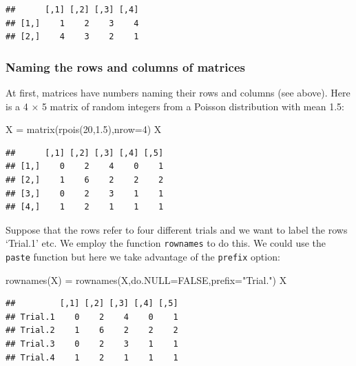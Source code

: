 \documentclass[
]{book}
\newenvironment{Shaded}{\begin{snugshade}}{\end{snugshade}}
\newcommand{\AttributeTok}[1]{\textcolor[rgb]{0.77,0.63,0.00}{#1}}
\newcommand{\ConstantTok}[1]{\textcolor[rgb]{0.00,0.00,0.00}{#1}}
\newcommand{\DecValTok}[1]{\textcolor[rgb]{0.00,0.00,0.81}{#1}}
\newcommand{\FloatTok}[1]{\textcolor[rgb]{0.00,0.00,0.81}{#1}}
\newcommand{\FunctionTok}[1]{\textcolor[rgb]{0.00,0.00,0.00}{#1}}
\newcommand{\NormalTok}[1]{#1}
\newcommand{\OtherTok}[1]{\textcolor[rgb]{0.56,0.35,0.01}{#1}}
\newcommand{\StringTok}[1]{\textcolor[rgb]{0.31,0.60,0.02}{#1}}
\begin{document}
\begin{verbatim}
##      [,1] [,2] [,3] [,4]
## [1,]    1    2    3    4
## [2,]    4    3    2    1
\end{verbatim}

\hypertarget{naming-the-rows-and-columns-of-matrices}{%
\subsubsection{Naming the rows and columns of matrices}\label{naming-the-rows-and-columns-of-matrices}}

At first, matrices have numbers naming their rows and columns (see above). Here is a 4 × 5 matrix of random integers from a Poisson distribution with mean 1.5:

\begin{Shaded}
\begin{Highlighting}[]
\NormalTok{X }\OtherTok{=} \FunctionTok{matrix}\NormalTok{(}\FunctionTok{rpois}\NormalTok{(}\DecValTok{20}\NormalTok{,}\FloatTok{1.5}\NormalTok{),}\AttributeTok{nrow=}\DecValTok{4}\NormalTok{)}
\NormalTok{X}
\end{Highlighting}
\end{Shaded}

\begin{verbatim}
##      [,1] [,2] [,3] [,4] [,5]
## [1,]    0    2    4    0    1
## [2,]    1    6    2    2    2
## [3,]    0    2    3    1    1
## [4,]    1    2    1    1    1
\end{verbatim}

Suppose that the rows refer to four different trials and we want to label the rows `Trial.1' etc. We employ the function \texttt{rownames} to do this. We could use the \texttt{paste} function but here we take advantage of the \texttt{prefix} option:

\begin{Shaded}
\begin{Highlighting}[]
\FunctionTok{rownames}\NormalTok{(X) }\OtherTok{=} \FunctionTok{rownames}\NormalTok{(X,}\AttributeTok{do.NULL=}\ConstantTok{FALSE}\NormalTok{,}\AttributeTok{prefix=}\StringTok{"Trial."}\NormalTok{)}
\NormalTok{X}
\end{Highlighting}
\end{Shaded}

\begin{verbatim}
##         [,1] [,2] [,3] [,4] [,5]
## Trial.1    0    2    4    0    1
## Trial.2    1    6    2    2    2
## Trial.3    0    2    3    1    1
## Trial.4    1    2    1    1    1
\end{verbatim}
\end{document}
